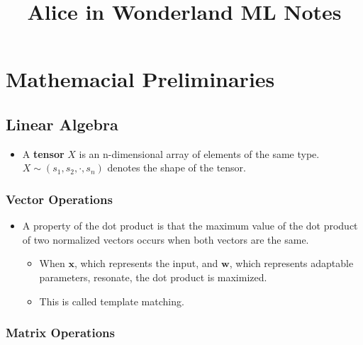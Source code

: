 \documentclass{article}
\title{\vspace{-3cm}Alice in Wonderland ML Notes}
\author{}
\date{}
\newcommand{\tbf}[1]{\textbf{#1}}
\newcommand{\mbf}[1]{\mathbf{#1}}
\begin{document}
\maketitle


\section{Mathemacial Preliminaries}

\subsection{Linear Algebra}

\begin{itemize}
    \item A \tbf{tensor} $X$ is an n-dimensional array of elements of the same type. $X \sim (s_1,s_2,\cdot,s_n)$ denotes the shape of the tensor.
\end{itemize}

\subsubsection{Vector Operations}

\begin{itemize}
    \item A property of the dot product is that the maximum value of the dot product of two normalized vectors occurs when both vectors are the same. 
    \begin{itemize}
        \item When $\mbf{x}$, which represents the input, and $\mbf{w}$, which represents adaptable parameters, resonate, the dot product is maximized.
        \item This is called template matching. 
    \end{itemize} 
\end{itemize}

\subsubsection{Matrix Operations}
\end{document}
